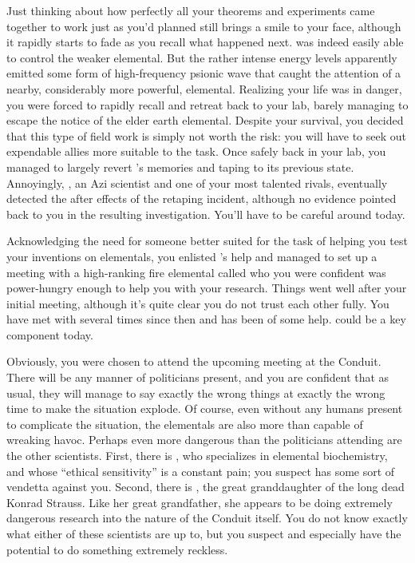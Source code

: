 \documentclass[char]{elementals}
\begin{document}
Just thinking about how perfectly all your theorems and experiments came together to work just as you'd planned still brings a smile to your face, although it rapidly starts to fade as you recall what happened next. \cDiplomat{} was indeed easily able to control the weaker elemental. But the rather intense energy levels apparently emitted some form of high-frequency psionic wave that caught the attention of a nearby, considerably more powerful, elemental. Realizing your life was in danger, you were forced to rapidly recall \cDiplomat{} and retreat back to your lab, barely managing to escape the notice of the elder earth elemental. Despite your survival, you decided that this type of field work is simply not worth the risk: you will have to seek out expendable allies more suitable to the task. Once safely back in your lab, you managed to largely revert \cDiplomat{}'s memories and taping to its previous state. Annoyingly, \cScientist{\intro}, an Azi scientist and one of your most talented rivals, eventually detected the after effects of the retaping incident, although no evidence pointed back to you in the resulting investigation. You'll have to be careful around \cScientist{} today.

Acknowledging the need for someone better suited for the task of helping you test your inventions on elementals, you enlisted \cDema{}'s help and managed to set up a meeting with a high-ranking fire elemental called \cPyro{\intro} who you were confident was power-hungry enough to help you with your research. Things went well after your initial meeting, although it's quite clear you do not trust each other fully. You have met with \cPyro{} several times since then and \cPyro{\they} has been of some help. \cPyro{\They} could be a key component today.

Obviously, you were chosen to attend the upcoming meeting at the Conduit. There will be any manner of politicians present, and you are confident that as usual, they will manage to say exactly the wrong things at exactly the wrong time to make the situation explode. Of course, even without any humans present to complicate the situation, the elementals are also more than capable of wreaking havoc. Perhaps even more dangerous than the politicians attending are the other scientists. First, there is \cScientist{}, who specializes in elemental biochemistry, and whose ``ethical sensitivity'' is a constant pain; you suspect \cScientist{\they} has some sort of vendetta against you. Second, there is \cGD{\intro}, the great granddaughter of the long dead Konrad Strauss. Like her great grandfather, she appears to be doing extremely dangerous research into the nature of the Conduit itself. You do not know exactly what either of these scientists are up to, but you suspect \cScientist{} and especially \cGD{} have the potential to do something extremely reckless.
\end{document}
